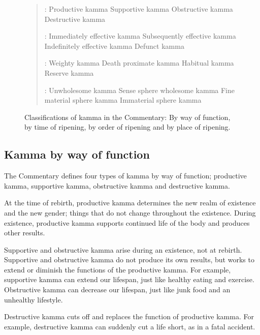 \begin{figure}[h]
\begin{quote}
:  Productive kamma  Supportive kamma  Obstructive kamma  Destructive kamma

:  Immediately effective kamma  Subsequently effective kamma  Indefinitely effective kamma  Defunct kamma

:  Weighty kamma  Death proximate kamma  Habitual kamma  Reserve kamma

:  Unwholesome kamma  Sense sphere wholesome kamma  Fine material sphere kamma  Immaterial sphere kamma

\end{quote}

\caption{Classifications of kamma in the Commentary: By way of function, by time of ripening, by order of ripening and by place of ripening.}
\label{fig:Classifications}
\end{figure}

\subsection*{Kamma by way of function}

The Commentary defines four types of kamma by way of function; productive kamma, supportive kamma, obstructive kamma and destructive kamma.

At the time of rebirth, productive kamma determines the new realm of existence and the new gender; things that do not change throughout the existence. During existence, productive kamma supports continued life of the body and produces other results.

Supportive and obstructive kamma arise during an existence, not at rebirth. Supportive and obstructive kamma do not produce its own results, but works to extend or diminish the functions of the productive kamma. For example, supportive kamma can extend our lifespan, just like healthy eating and exercise. Obstructive kamma can decrease our lifespan, just like junk food and an unhealthy lifestyle.

Destructive kamma cuts off and replaces the function of productive kamma. For example, destructive kamma can suddenly cut a life short, as in a fatal accident.

